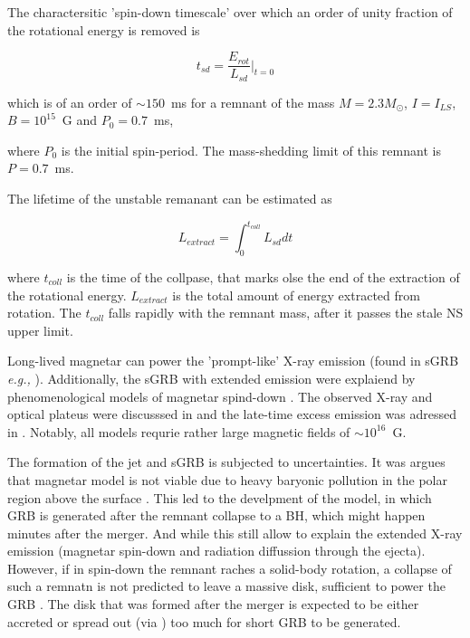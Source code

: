 \documentclass[11pt,a4paper,headinclude=true,DIV=14,BCOR=8mm,chapterprefix,listof=totoc,twoside,openright,abstracton]{scrbook}
\begin{document}
The charactersitic 'spin-down timescale' over which an order of unity fraction of the rotational energy is removed is 

\begin{equation}
    t_{sd} = \frac{E_{rot}}{L_{sd}}\Bigg|_{t=0}
\end{equation}

which is of an order of $\sim 150$~ms for a remnant of the mass $M=2.3M_{\odot}$, $I=I_{LS}$, $B=10^{15}$~G and $P_0=0.7$~ms, 

where $P_0$ is the initial spin-period.
The mass-shedding limit of this remnant is $P=0.7$~ms. 

The lifetime of the unstable remanant can be estimated as 

\begin{equation}
    L_{extract} = \int_0^{t_{coll}} L_{sd} dt
\end{equation}

where $t_{coll}$ is the time of the collpase, that marks olse the end of the extraction of the rotational energy. $L_{extract}$ is the total amount of energy extracted from rotation.
The $t_{coll}$ falls rapidly with the remnant mass, after it passes the stale NS upper limit.

Long-lived magnetar can power the 'prompt-like' X-ray emission (found in sGRB \textit{e.g.,} \cite{(Gao and Fan 2006)Metzger et al (2008b); Bucciantini et al (2012)} ). Additionally, the sGRB with extended emission were explaiend by phenomenological models of magnetar spind-down \cite{(Gompertz et al 2013)}. The observed X-ray and optical plateus were discusssed in \cite{(Rowlinson et al 2010, 2013; Gompertz et al 2015)} and the late-time excess emission was adressed in \cite{(Fan et al 2013; Fong et al 2014a)}. Notably, all models requrie rather large magnetic fields of $\sim 10^{16}$~G.

The formation of the jet and sGRB is subjected to uncertainties. 
It was argues that magnetar model is not viable due to heavy baryonic pollution in the polar region above the surface \cite{(Murguia-Berthier et al 2014, 2016).}. This led to the develpment of the model, in which GRB is generated after the remnant collapse to a BH, which might happen minutes after the merger. And while this still allow to explain the extended X-ray emission (magnetar spin-down and radiation diffussion through the ejecta). 
However, if in spin-down the remnant raches a solid-body rotation, a collapse of such a remnatn is not predicted to leave a massive disk, sufficient to power the GRB \cite{Margalit et al (2015)}. The disk that was formed after the merger is expected to be either accreted or spread out (via ) too much for short GRB to be generated. 
\end{document}
